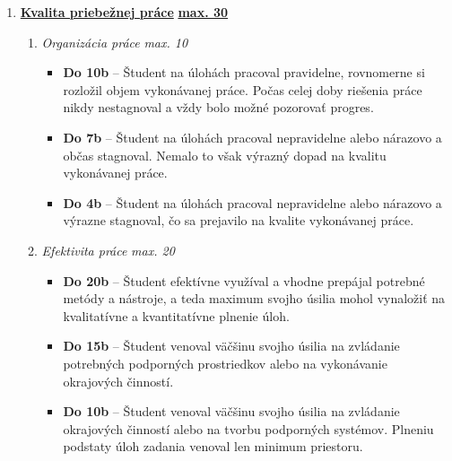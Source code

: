 \begin{enumerate}[label=\textbf{\arabic*.}]
\begin{enumerate}
        \item \textit{Kvalitatívne plnenie úloh} \hfill \textit{max. 10}
        \begin{itemize}
            \item \textbf{Do 10b} – Výsledky realizovaných úloh úplne spĺňajú očakávania vedúceho.
            \item \textbf{Do 7b} – Niektorá z úloh, bez ohľadu na rozsah vykonanej práce, nemá výstupy v požadovanej kvalite.
            \item \textbf{0b} – Prevažná časť výstupov realizovaných úloh nespĺňa očakávania vedúceho.
        \end{itemize}
    \end{enumerate}

    \item \underline{\textbf{Kvalita priebežnej práce}} \hfill \underline{\textbf{max. 30}}
    
    \begin{enumerate}
        \item \textit{Organizácia práce} \hfill \textit{max. 10}
        \begin{itemize}
            \item \textbf{Do 10b} – Študent na úlohách pracoval pravidelne, rovnomerne si rozložil objem vykonávanej práce. Počas celej doby riešenia práce nikdy nestagnoval a vždy bolo možné pozorovať progres.
            \item \textbf{Do 7b} – Študent na úlohách pracoval nepravidelne alebo nárazovo a občas stagnoval. Nemalo to však výrazný dopad na kvalitu vykonávanej práce.
            \item \textbf{Do 4b} – Študent na úlohách pracoval nepravidelne alebo nárazovo a výrazne stagnoval, čo sa prejavilo na kvalite vykonávanej práce.
        \end{itemize}

        \item \textit{Efektivita práce} \hfill \textit{max. 20}
        \begin{itemize}
            \item \textbf{Do 20b} – Študent efektívne využíval a vhodne prepájal potrebné metódy a nástroje, a teda maximum svojho úsilia mohol vynaložiť na kvalitatívne a kvantitatívne plnenie úloh.
            \item \textbf{Do 15b} – Študent venoval väčšinu svojho úsilia na zvládanie potrebných podporných prostriedkov alebo na vykonávanie okrajových činností.
            \item \textbf{Do 10b} – Študent venoval väčšinu svojho úsilia na zvládanie okrajových činností alebo na tvorbu podporných systémov. Plneniu podstaty úloh zadania venoval len minimum priestoru.
        \end{itemize}
    \end{enumerate}


\end{enumerate}
